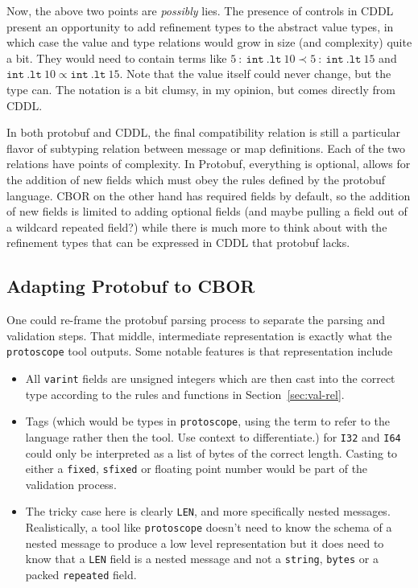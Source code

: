 \documentclass[11pt]{article}
\theoremstyle{definition}
\theoremstyle{plain}
\begin{document}
Now, the above two points are \emph{possibly} lies. The presence of controls in
CDDL present an opportunity to add refinement types to the abstract value types,
in which case the value and type relations would grow in size (and complexity)
quite a bit. They would need to contain terms like
$5\ :\ \mathtt{int}\ .\mathtt{lt}\ 10 \prec 5\ :\ \mathtt{int}\ .\mathtt{lt}\ 15$
and $\mathtt{int}\ \mathtt{.lt}\ 10 \propto \mathtt{int}\ \mathtt{.lt}\ 15$. Note that
the value itself could never change, but the type can. The notation is a bit
clumsy, in my opinion, but comes directly from CDDL.

In both protobuf and CDDL, the final compatibility relation is still a
particular flavor of subtyping relation between message or map definitions. Each
of the two relations have points of complexity. In Protobuf, everything is
optional, allows for the addition of new fields which must obey the rules
defined by the protobuf language. CBOR on the other hand has required fields by
default, so the addition of new fields is limited to adding optional fields (and
maybe pulling a field out of a wildcard repeated field?) while there is much
more to think about with the refinement types that can be expressed in CDDL that
protobuf lacks.

\subsection{Adapting Protobuf to CBOR}

One could re-frame the protobuf parsing process to separate the parsing and
validation steps. That middle, intermediate representation is exactly what the
\texttt{protoscope} tool outputs. Some notable features is that representation
include

\begin{itemize}
\item All \texttt{varint} fields are unsigned integers which are then cast into
  the correct type according to the rules and functions in
  Section~\ref{sec:val-rel}.
\item Tags (which would be types in \texttt{protoscope}, using the term to refer
  to the language rather then the tool. Use context to differentiate.) for
  \texttt{I32} and \texttt{I64} could only be interpreted as a list of bytes of
  the correct length. Casting to either a \texttt{fixed}, \texttt{sfixed} or
  floating point number would be part of the validation process.
\item The tricky case here is clearly \texttt{LEN}, and more specifically nested
  messages. Realistically, a tool like \texttt{protoscope} doesn't need to know
  the schema of a nested message to produce a low level representation but it
  does need to know that a \texttt{LEN} field is a nested message and not a
  \texttt{string}, \texttt{bytes} or a packed \texttt{repeated} field.
\end{itemize}
\end{document}
